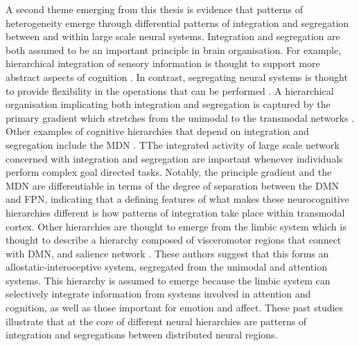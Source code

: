 A second theme emerging from this thesis is evidence that patterns of heterogeneity emerge through differential patterns of integration and segregation between and within large scale neural systems. Integration and segregation are both assumed to be an important principle in brain organisation. 
For example, hierarchical integration of sensory information is thought to support more abstract aspects of cognition \cite{Mesulam1998}. In contrast, segregating neural systems is thought to provide flexibility in the operations that can be performed \cite{Buckner2013}. A hierarchical organisation implicating both integration and segregation is captured by the primary gradient which stretches from the unimodal to the transmodal networks \cite{Margulies2016}.
Other examples of cognitive hierarchies that depend on integration and segregation include the MDN \cite{Duncan2010}. TThe integrated activity of large scale network concerned with integration and segregation are important whenever individuals perform complex goal directed tasks.  Notably, the principle gradient and the MDN are differentiable in terms of the degree of separation between the DMN and FPN, indicating that a defining features of what makes these neurocognitive hierarchies different is how patterns of integration take place within transmodal cortex. 
Other hierarchies are thought to emerge from the limbic system which is thought to describe a hierarchy composed of visceromotor regions that connect with DMN, and salience network \cite{Kleckner2017}. These authors suggest that this forms an allostatic-interoceptive system, segregated from the unimodal and attention systems. This hierarchy is assumed to emerge because the limbic system can selectively integrate information from systems involved in attention and cognition, as well as those important for emotion and affect. 
These past studies illustrate that at the core of different neural hierarchies are patterns of integration and segregations between distributed neural regions.

